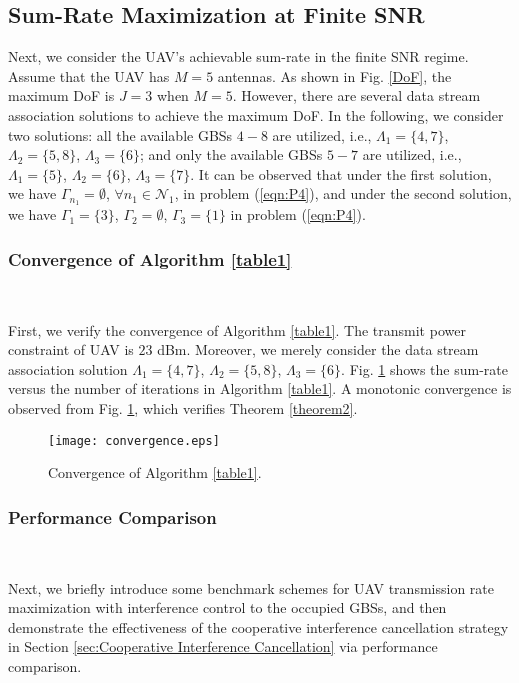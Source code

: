 \documentclass[onecolumn, draftclsnofoot, 12pt]{IEEEtran}
\begin{document}
\subsection{Sum-Rate Maximization at Finite SNR}
Next, we consider the UAV's achievable sum-rate in the finite SNR regime. Assume that the UAV has $M=5$ antennas. As shown in Fig. \ref{DoF}, the maximum DoF is $J=3$ when $M=5$. However, there are several data stream association solutions to achieve the maximum DoF. In the following, we consider two solutions: all the available GBSs $4-8$ are utilized, i.e., $\Lambda_1=\{4,7\}$, $\Lambda_2=\{5,8\}$, $\Lambda_3=\{6\}$; and only the available GBSs $5-7$ are utilized, i.e., $\Lambda_1=\{5\}$, $\Lambda_2=\{6\}$, $\Lambda_3=\{7\}$. It can be observed that under the first solution, we have $\Gamma_{n_1}=\emptyset$, $\forall n_1\in \mathcal{N}_1$, in problem (\ref{eqn:P4}), and under the second solution, we have $\Gamma_1=\{3\}$, $\Gamma_2=\emptyset$, $\Gamma_3=\{1\}$ in problem (\ref{eqn:P4}).

\subsubsection{Convergence of Algorithm \ref{table1}}

\ \ \

First, we verify the convergence of Algorithm \ref{table1}. The transmit power constraint of UAV is $23$ dBm. Moreover, we merely consider the data stream association solution $\Lambda_1=\{4,7\}$, $\Lambda_2=\{5,8\}$, $\Lambda_3=\{6\}$. Fig. \ref{convergence} shows the sum-rate versus the number of iterations in Algorithm \ref{table1}. A monotonic convergence is observed from Fig. \ref{convergence}, which verifies Theorem \ref{theorem2}.

\begin{figure}[t]
  \centering
  \texttt{[image: convergence.eps]}
  \caption{Convergence of Algorithm \ref{table1}.}\label{convergence}
\end{figure}

\subsubsection{Performance Comparison}

\ \ \

Next, we briefly introduce some benchmark schemes for UAV transmission rate maximization with interference control to the occupied GBSs, and then demonstrate the effectiveness of the cooperative interference cancellation strategy in Section \ref{sec:Cooperative Interference Cancellation} via performance comparison.
\end{document}
